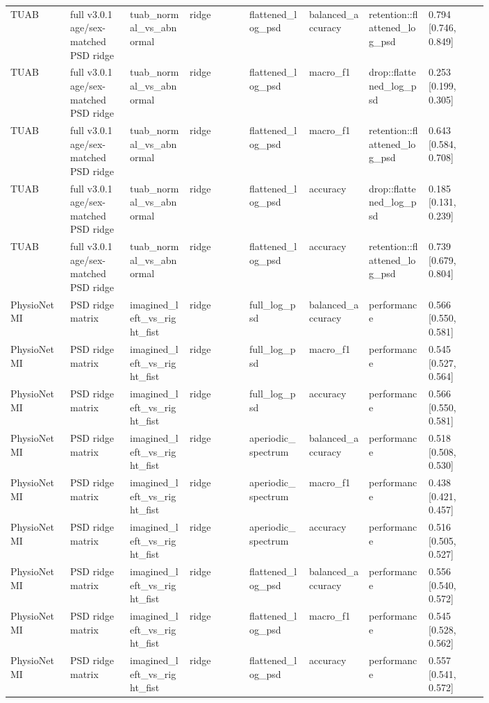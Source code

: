 \begin{longtable}{p{0.10\linewidth}p{0.10\linewidth}p{0.10\linewidth}p{0.10\linewidth}p{0.10\linewidth}p{0.10\linewidth}p{0.10\linewidth}p{0.10\linewidth}}
TUAB & full v3.0.1 age/sex-matched PSD ridge & tuab\_normal\_vs\_abnormal & ridge & flattened\_log\_psd & balanced\_accuracy & retention::flattened\_log\_psd & 0.794 [0.746, 0.849]\\
TUAB & full v3.0.1 age/sex-matched PSD ridge & tuab\_normal\_vs\_abnormal & ridge & flattened\_log\_psd & macro\_f1 & drop::flattened\_log\_psd & 0.253 [0.199, 0.305]\\
TUAB & full v3.0.1 age/sex-matched PSD ridge & tuab\_normal\_vs\_abnormal & ridge & flattened\_log\_psd & macro\_f1 & retention::flattened\_log\_psd & 0.643 [0.584, 0.708]\\
TUAB & full v3.0.1 age/sex-matched PSD ridge & tuab\_normal\_vs\_abnormal & ridge & flattened\_log\_psd & accuracy & drop::flattened\_log\_psd & 0.185 [0.131, 0.239]\\
TUAB & full v3.0.1 age/sex-matched PSD ridge & tuab\_normal\_vs\_abnormal & ridge & flattened\_log\_psd & accuracy & retention::flattened\_log\_psd & 0.739 [0.679, 0.804]\\
PhysioNet MI & PSD ridge matrix & imagined\_left\_vs\_right\_fist & ridge & full\_log\_psd & balanced\_accuracy & performance & 0.566 [0.550, 0.581]\\
PhysioNet MI & PSD ridge matrix & imagined\_left\_vs\_right\_fist & ridge & full\_log\_psd & macro\_f1 & performance & 0.545 [0.527, 0.564]\\
PhysioNet MI & PSD ridge matrix & imagined\_left\_vs\_right\_fist & ridge & full\_log\_psd & accuracy & performance & 0.566 [0.550, 0.581]\\
PhysioNet MI & PSD ridge matrix & imagined\_left\_vs\_right\_fist & ridge & aperiodic\_spectrum & balanced\_accuracy & performance & 0.518 [0.508, 0.530]\\
PhysioNet MI & PSD ridge matrix & imagined\_left\_vs\_right\_fist & ridge & aperiodic\_spectrum & macro\_f1 & performance & 0.438 [0.421, 0.457]\\
PhysioNet MI & PSD ridge matrix & imagined\_left\_vs\_right\_fist & ridge & aperiodic\_spectrum & accuracy & performance & 0.516 [0.505, 0.527]\\
PhysioNet MI & PSD ridge matrix & imagined\_left\_vs\_right\_fist & ridge & flattened\_log\_psd & balanced\_accuracy & performance & 0.556 [0.540, 0.572]\\
PhysioNet MI & PSD ridge matrix & imagined\_left\_vs\_right\_fist & ridge & flattened\_log\_psd & macro\_f1 & performance & 0.545 [0.528, 0.562]\\
PhysioNet MI & PSD ridge matrix & imagined\_left\_vs\_right\_fist & ridge & flattened\_log\_psd & accuracy & performance & 0.557 [0.541, 0.572]\\

\end{longtable}
